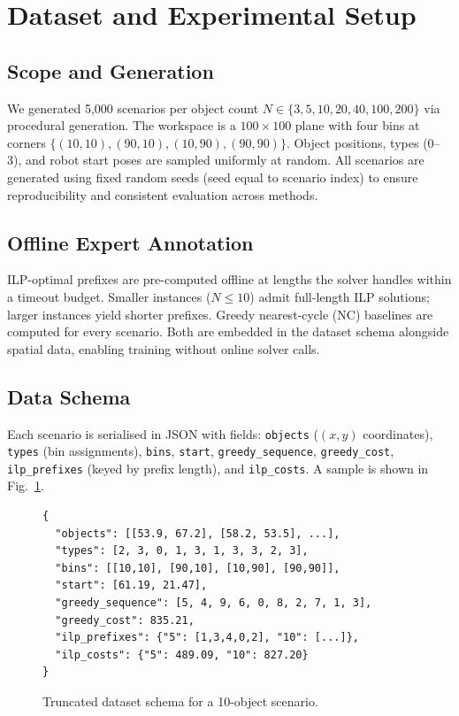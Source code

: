 \documentclass[conference]{IEEEtran}
\begin{document}
\section{Dataset and Experimental Setup}\label{sec:data}

\subsection{Scope and Generation}

We generated 5{,}000 scenarios per object count $N \in \{3, 5, 10, 20, 40, 100, 200\}$ via procedural generation. The workspace is a $100 \times 100$ plane with four bins at corners $\{(10,10), (90,10), (10,90), (90,90)\}$. Object positions, types (0--3), and robot start poses are sampled uniformly at random. All scenarios are generated using fixed random seeds (seed equal to scenario index) to ensure reproducibility and consistent evaluation across methods.

\subsection{Offline Expert Annotation}

ILP-optimal prefixes are pre-computed offline at lengths the solver handles within a timeout budget. Smaller instances ($N{\le}10$) admit full-length ILP solutions; larger instances yield shorter prefixes. Greedy nearest-cycle (NC) baselines are computed for every scenario. Both are embedded in the dataset schema alongside spatial data, enabling training without online solver calls.

\subsection{Data Schema}

Each scenario is serialised in JSON with fields: \texttt{objects} ($(x,y)$ coordinates), \texttt{types} (bin assignments), \texttt{bins}, \texttt{start}, \texttt{greedy\_sequence}, \texttt{greedy\_cost}, \texttt{ilp\_prefixes} (keyed by prefix length), and \texttt{ilp\_costs}. A sample is shown in Fig.~\ref{fig:json_sample}.

\begin{figure}[htbp]
\centering
\begin{scriptsize}
\begin{verbatim}
{
  "objects": [[53.9, 67.2], [58.2, 53.5], ...],
  "types": [2, 3, 0, 1, 3, 1, 3, 3, 2, 3],
  "bins": [[10,10], [90,10], [10,90], [90,90]],
  "start": [61.19, 21.47],
  "greedy_sequence": [5, 4, 9, 6, 0, 8, 2, 7, 1, 3],
  "greedy_cost": 835.21,
  "ilp_prefixes": {"5": [1,3,4,0,2], "10": [...]},
  "ilp_costs": {"5": 489.09, "10": 827.20}
}
\end{verbatim}
\end{scriptsize}
\caption{Truncated dataset schema for a 10-object scenario.}
\label{fig:json_sample}
\end{figure}
\end{document}
